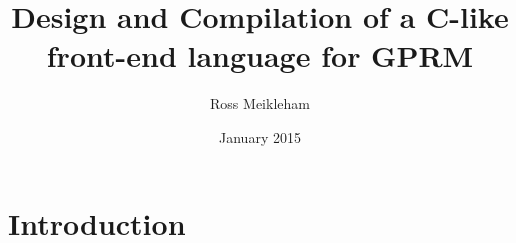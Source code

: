 \documentclass{l4proj}
\begin{document}
\title{Design and Compilation of a C-like front-end language for GPRM}
\author{Ross Meikleham}
\date{January 2015}
\maketitle

\begin{abstract}

\end{abstract}

\educationalconsent
%
%
\tableofcontents

\chapter{Introduction}

















\end{document}
